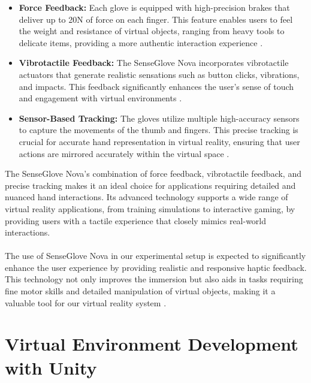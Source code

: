 \begin{itemize}
\item \textbf{Force Feedback:} Each glove is equipped with high-precision brakes that deliver up to 20N of force on each finger. This feature enables users to feel the weight and resistance of virtual objects, ranging from heavy tools to delicate items, providing a more authentic interaction experience \cite{senseglove_nova}.
\item \textbf{Vibrotactile Feedback:} The SenseGlove Nova incorporates vibrotactile actuators that generate realistic sensations such as button clicks, vibrations, and impacts. This feedback significantly enhances the user's sense of touch and engagement with virtual environments \cite{vibrotactile_feedback}.

\item \textbf{Sensor-Based Tracking:} The gloves utilize multiple high-accuracy sensors to capture the movements of the thumb and fingers. This precise tracking is crucial for accurate hand representation in virtual reality, ensuring that user actions are mirrored accurately within the virtual space \cite{sensor_tracking}.
\end{itemize}
\noindent
The SenseGlove Nova's combination of force feedback, vibrotactile feedback, and precise tracking makes it an ideal choice for applications requiring detailed and nuanced hand interactions. Its advanced technology supports a wide range of virtual reality applications, from training simulations to interactive gaming, by providing users with a tactile experience that closely mimics real-world interactions.\\ \\
The use of SenseGlove Nova in our experimental setup is expected to significantly enhance the user experience by providing realistic and responsive haptic feedback. This technology not only improves the immersion but also aids in tasks requiring fine motor skills and detailed manipulation of virtual objects, making it a valuable tool for our virtual reality system \cite{advanced_haptic_gloves_review}.



\section{Virtual Environment Development with Unity}
\label{subsec:VirtualEnvironmentDevelopmentWithUnity}

